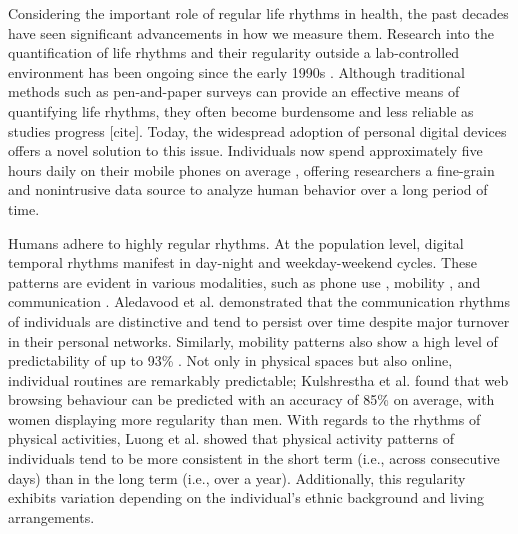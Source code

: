\documentclass[pdflatex,sn-vancouver,Numbered]{bst/sn-jnl}%
\theoremstyle{thmstyleone}%
\theoremstyle{thmstyletwo}%
\theoremstyle{thmstylethree}%
\begin{document}
Considering the important role of regular life rhythms in health, the past decades have seen significant advancements in how we measure them. Research into the quantification of life rhythms and their regularity outside a lab-controlled environment has been ongoing since the early 1990s  \cite{monk1990social, monk1994regularity, buysse1989pittsburgh}. Although traditional methods such as pen-and-paper surveys can provide an effective means of quantifying life rhythms, they often become burdensome and less reliable as studies progress [cite]. Today, the widespread adoption of personal digital devices offers a novel solution to this issue. Individuals now spend approximately five hours daily on their mobile phones on average \cite{datareportal2024digital}, offering researchers a fine-grain and nonintrusive data source to analyze human behavior over a long period of time. 

Humans adhere to highly regular rhythms. At the population level, digital temporal rhythms manifest in day-night and weekday-weekend cycles. These patterns are evident in various modalities, such as phone use \citep{aledavood2022quantifying}, mobility \citep{ahas2010daily, song2010limits}, and communication \citep{aledavoodDigitalDailyCycles2015}. Aledavood et al. \citep{aledavoodDailyRhythmsMobile2015a} demonstrated that the communication rhythms of individuals are distinctive and tend to persist over time despite major turnover in their personal networks. Similarly, mobility patterns also show a high level of predictability of up to 93\% \citep{song2010limits}. Not only in physical spaces but also online, individual routines are remarkably predictable; Kulshrestha et al. \citep{kulshrestha2021web} found that web browsing behaviour can be predicted with an accuracy of 85\% on average, with women displaying more regularity than men. With regards to the rhythms of physical activities, Luong et al. \citep{luong2023impact} showed that physical activity patterns of individuals tend to be more consistent in the short term (i.e., across consecutive days) than in the long term (i.e., over a year). Additionally, this regularity exhibits variation depending on the individual's ethnic background and living arrangements. 
\end{document}
